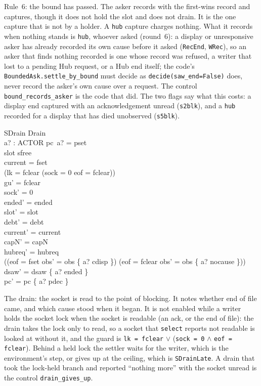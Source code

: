 \documentclass[a4paper,10pt,fleqn]{article}
\begin{document}
Rule~6: the bound has passed.  The asker records with the first-wins record and
captures, though it does not hold the slot and does not drain.  It is the one
capture that is not by a holder.  A \texttt{hub} capture charges nothing.  What
it records when nothing stands is \texttt{hub}, whoever asked (round~6): a
display or unresponsive asker has already recorded its own cause before it asked
(\texttt{RecEnd}, \texttt{WRec}), so an asker that finds nothing recorded is one
whose record was refused, a writer that lost to a pending Hub request, or a Hub
end itself; the code's \texttt{BoundedAsk.settle\_by\_bound} must decide as
\texttt{decide(saw\_end=False)} does, never record the asker's own cause over a
request.  The control \texttt{bound\_records\_asker} is the code that did.
The two flags say what this costs: a display end captured with an
acknowledgement unread (\texttt{s2blk}), and a \texttt{hub} recorded for a
display that has died unobserved (\texttt{s5blk}).

\begin{schema}{SDrain}
  Drain \\
  a? : ACTOR
\where
  pc~a? = pset \\
  slot \neq sfree \\
  current = fset \\
  (lk = fclear \lor (sock = 0 \land eof = fclear)) \\
  gu' = fclear \\
  sock' = 0 \\
  ended' = ended \\
  slot' = slot \\
  debt' = debt \\
  current' = current \\
  capN' = capN \\
  hubreq' = hubreq \\
  ((eof = fset \land obs' = obs \oplus \{ a? \mapsto cdisp \}) \lor
    (eof = fclear \land obs' = obs \oplus \{ a? \mapsto nocause \})) \\
  dsaw' = dsaw \oplus \{ a? \mapsto ended \} \\
  pc' = pc \oplus \{ a? \mapsto pdec \}
\end{schema}

The drain: the socket is read to the point of blocking.  It notes whether end of
file came, and which cause stood when it began.  It is not enabled while a writer
holds the socket lock when the socket is readable (an ack, or the end of file):
the drain takes the lock only to read, so a socket that \texttt{select} reports
not readable is looked at without it, and the guard is
\texttt{lk = fclear} $\lor$ (\texttt{sock = 0} $\land$ \texttt{eof = fclear}).
Behind a held lock the settler waits for the writer, which is the environment's
step, or gives up at the ceiling, which is \texttt{SDrainLate}.  A drain that
took the lock-held branch and reported ``nothing more'' with the socket unread
is the control \texttt{drain\_gives\_up}.
\end{document}
